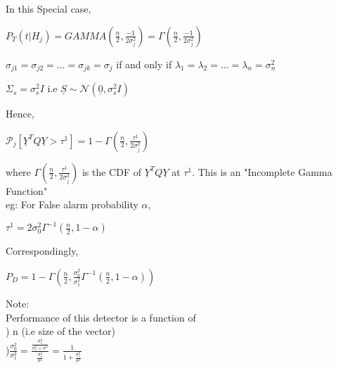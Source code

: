 \documentclass[12pt]{report}
\begin{document}
\noindent In this Special case,\\
\begin{center}	
\noindent	$P_T(t|H_j)=GAMMA(\frac{n}{2},\frac{-1}{2\sigma_j^{2}})=\Gamma(\frac{n}{2},\frac{-1}{2\sigma_j^{2}})$\\
\end{center}
\begin{center}	
\noindent	$\sigma_{j1}=\sigma_{j2}=\ldots=\sigma_{jk}=\sigma_j$ if and only if $\lambda_1=\lambda_2=\ldots=\lambda_n=\sigma_n^{2}$\\
\end{center}
\begin{center}
\noindent	$\Sigma_s=\sigma_s^{2}I$ i.e $\underline{S}\sim\mathcal{N}(\underline{0},\sigma_s^{2}I)$\\
\end{center}	
\noindent	Hence,
\begin{center}
 $\mathcal{P}_j[\underline{Y}^TQ\underline{Y}>\tau^1]=1-\Gamma(\frac{n}{2},\frac{\tau^1}{2\sigma_j^{2}})$\\
\end{center}
\noindent	where $\Gamma(\frac{n}{2},\frac{\tau^1}{2\sigma_j^{2}})$ is the CDF of $\underline{Y}^TQ\underline{Y}$ at $\tau^1$. This is an "Incomplete Gamma Function"\\
	
\noindent eg: For False alarm probability $\alpha$,\\
\begin{center}		
\noindent	$\tau^1=2\sigma_0^{2}\Gamma^{-1}(\frac{n}{2},1-\alpha)$\\
\end{center}	
\noindent	Correspondingly,\\
	\begin{center}
\noindent	$P_D=1-\Gamma(\frac{n}{2},\frac{\sigma_0^{2}}{\sigma_1^{2}}\Gamma^{-1}(\frac{n}{2},1-\alpha))$\\
\end{center}
\noindent	Note: \\
	
\noindent	Performance of this detector is a function of \\
	
) n  (i.e size of the vector)  \\
)$\frac{\sigma_0^{2}}{\sigma_1^{2}}=\frac{\frac{\sigma_s^{2}}{\sigma_s^{2}+\sigma^2}}{\frac{\sigma_s^{2}}{\sigma^2}}=\frac{1}{1+\frac{\sigma_s^{2}}{\sigma^2}}$\\
	
\end{document}
